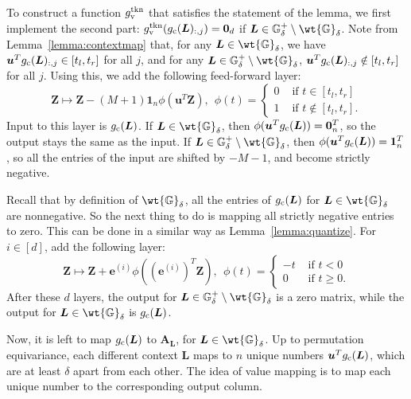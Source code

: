 \documentclass{article} %
\def\vzero{{\bm{0}}}
\def\vone{{\bm{1}}}
\def\ve{{\bm{e}}}
\def\vu{{\bm{u}}}
\def\mA{{\bm{A}}}
\def\mL{{\bm{L}}}
\def\mZ{{\bm{Z}}}
\def\sG{{\mathbb{G}}}
\begin{document}
To construct a function $g_{\rm v}^{\rm tkn}$ that satisfies the statement of the lemma, we first implement the second part: $g_{\rm v}^{\rm tkn}(g_{\rm c}(\mL)_{:,j}) = \vzero_d$ if $\mL \in \sG^+_{\delta} \setminus \wt \sG_{\delta}$.
Note from Lemma~\ref{lemma:contextmap} that, for any $\mL \in \wt \sG_{\delta}$, we have $\vu^T g_{\rm c}(\mL)_{:,j} \in [t_l, t_r]$ for all $j$, and for any $\mL \in \sG^+_{\delta} \setminus \wt \sG_{\delta}$, $\vu^T g_{\rm c}(\mL)_{:,j} \notin [t_l, t_r]$ for all $j$.
Using this, we add the following feed-forward layer:
\begin{equation*}
    \mZ \mapsto \mZ - (M+1) \vone_n \phi (\vu^T \mZ),
    ~~
    \phi(t)
    =
    \begin{cases}
        0 & \text{ if } t \in [t_l, t_r]\\
        1 & \text{ if } t \notin [t_l, t_r].
    \end{cases}
\end{equation*}
Input to this layer is $g_{\rm c}(\mL)$. If $\mL \in \wt \sG_{\delta}$, then $\phi(\vu^T g_{\rm c}(\mL)) = \vzero_n^T$, so the output stays the same as the input.
If $\mL \in \sG^+_{\delta} \setminus \wt \sG_{\delta}$, then $\phi(\vu^T g_{\rm c}(\mL)) = \vone_n^T$, so all the entries of the input are shifted by $-M-1$, and become strictly negative.

Recall that by definition of $\wt \sG_{\delta}$, all the entries of $g_{\rm c}(\mL)$ for $\mL \in \wt \sG_{\delta}$ are nonnegative. So the next thing to do is mapping all strictly negative entries to zero.
This can be done in a similar way as Lemma~\ref{lemma:quantize}.
For $i \in [d]$, add the following layer:
\begin{equation*}
    \mZ \mapsto \mZ + \ve^{(i)} \phi ((\ve^{(i)})^T \mZ),
    ~~
    \phi(t)
    =
    \begin{cases}
        -t & \text{ if } t < 0\\
        0 & \text{ if } t \geq 0.
    \end{cases}
\end{equation*}
After these $d$ layers, the output for $\mL \in \sG^+_{\delta} \setminus \wt \sG_{\delta}$ is a zero matrix, while the output for $\mL \in \wt \sG_{\delta}$ is $g_{\rm c}(\mL)$.

Now, it is left to map $g_{\rm c}(\mL)$ to $\mA_\mL$, for $\mL \in \wt \sG_{\delta}$. Up to permutation equivariance, each different context $\mL$ maps to $n$ unique numbers $\vu^T g_{\rm c}(\mL)$, which are at least $\delta$ apart from each other. The idea of value mapping is to map each unique number to the corresponding output column.
\end{document}
